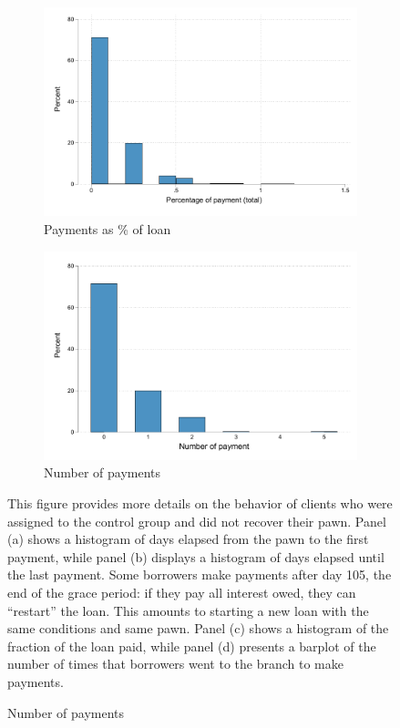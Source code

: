 \begin{figure}[!h]
\begin{center}
\begin{subfigure}{0.35\textwidth}
    \end{subfigure}
        \begin{subfigure}{0.35\textwidth}
        \caption{Payments as \% of loan}
        \centering
        \includegraphics[width=\textwidth]{Figuras/hist_percpay_default.pdf}
    \end{subfigure}
    \begin{subfigure}{0.35\textwidth}
        \caption{Number of payments}
        \centering
        \includegraphics[width=\textwidth]{Figuras/hist_numpay_default.pdf}
    \end{subfigure}
    \end{center}
        \scriptsize 
        This figure provides more details on the behavior of clients who were assigned to the control group and did not recover their pawn. Panel (a) shows a histogram of days elapsed from the pawn to the first payment, while panel (b) displays a histogram of days elapsed until the last payment. Some borrowers make payments after day 105, the end of the grace period: if they pay all interest owed, they can ``restart'' the loan. This amounts to starting a new loan with the same conditions and same pawn. Panel (c) shows a histogram of the fraction of the loan paid, while panel (d) presents a barplot of the number of times that borrowers went to the branch to make payments.
\end{figure}


